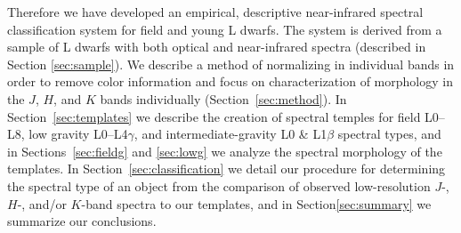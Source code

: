 \documentclass[12pt,preprint]{aastex}
\newcommand{\sample}{180}
\begin{document}
Therefore we have developed an empirical, descriptive near-infrared spectral classification system for field and young L dwarfs. The system is derived from a sample of L dwarfs with both optical and near-infrared spectra (described in Section \ref{sec:sample}). We describe a method of normalizing in individual bands in order to remove color information and focus on characterization of morphology in the $J$, $H$, and $K$ bands individually (Section~\ref{sec:method}). In Section~\ref{sec:templates} we describe the creation of spectral temples for field L0--L8, low gravity L0--L4$\gamma$, and intermediate-gravity L0 \& L1$\beta$ spectral types, and in Sections~\ref{sec:fieldg} and \ref{sec:lowg} we analyze the spectral morphology of the templates. In Section~\ref{sec:classification} we detail our procedure for determining the spectral type of an object from the comparison of observed low-resolution $J$-, $H$-, and/or $K$-band spectra to our templates, and in Section\ref{sec:summary} we summarize our conclusions.


\end{document}
